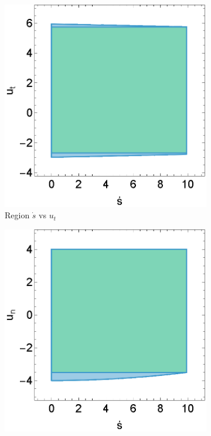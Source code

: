 \begin{figure}[h]
	\centering
	\begin{subfigure}[b]{0.32\textwidth}
		\centering
		\includegraphics[width=\textwidth]{figures/inner_polytope/region_x3u1_plot_gr1.eps}
		\caption{Region $\dot{s}$ vs $u_t$}
	\end{subfigure}
	\begin{subfigure}[b]{0.32\textwidth}
		\centering
		\includegraphics[width=\textwidth]{figures/inner_polytope/region_x3u2_plot_gr1.eps}

\end{subfigure}
\end{figure}

